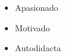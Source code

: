 %
%
%

\twocolumnsection
{
\begin{skills}
\end{skills}}
{
\vspace{1em}
\begin{itemize}
	\item Apasionado
	\item Motivado                    
    \item Autodidacta
\end{itemize}
}
